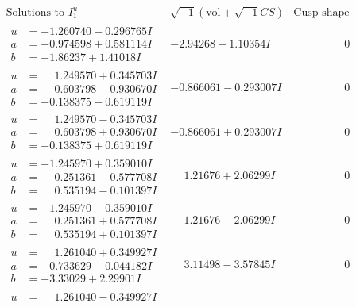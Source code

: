 \documentclass[1p]{elsarticle_modified}
\theoremstyle{definition}
\newcommand{\I}{\sqrt{-1}}
\begin{document}
$$\begin{array}{c|c|c}
\text{Solutions to }I^u_{1}& \I (\text{vol} + \sqrt{-1}CS) & \text{Cusp shape}\\
 \hline 
\begin{aligned}
u &= -1.260740 - 0.296765 I \\
a &= -0.974598 + 0.581114 I \\
b &= -1.86237 + 1.41018 I\end{aligned}
 & -2.94268 - 1.10354 I & \phantom{-0.000000 } 0 \\ \hline\begin{aligned}
u &= \phantom{-}1.249570 + 0.345703 I \\
a &= \phantom{-}0.603798 - 0.930670 I \\
b &= -0.138375 - 0.619119 I\end{aligned}
 & -0.866061 - 0.293007 I & \phantom{-0.000000 } 0 \\ \hline\begin{aligned}
u &= \phantom{-}1.249570 - 0.345703 I \\
a &= \phantom{-}0.603798 + 0.930670 I \\
b &= -0.138375 + 0.619119 I\end{aligned}
 & -0.866061 + 0.293007 I & \phantom{-0.000000 } 0 \\ \hline\begin{aligned}
u &= -1.245970 + 0.359010 I \\
a &= \phantom{-}0.251361 - 0.577708 I \\
b &= \phantom{-}0.535194 - 0.101397 I\end{aligned}
 & \phantom{-}1.21676 + 2.06299 I & \phantom{-0.000000 } 0 \\ \hline\begin{aligned}
u &= -1.245970 - 0.359010 I \\
a &= \phantom{-}0.251361 + 0.577708 I \\
b &= \phantom{-}0.535194 + 0.101397 I\end{aligned}
 & \phantom{-}1.21676 - 2.06299 I & \phantom{-0.000000 } 0 \\ \hline\begin{aligned}
u &= \phantom{-}1.261040 + 0.349927 I \\
a &= -0.733629 - 0.044182 I \\
b &= -3.33029 + 2.29901 I\end{aligned}
 & \phantom{-}3.11498 - 3.57845 I & \phantom{-0.000000 } 0 \\ \hline\begin{aligned}
u &= \phantom{-}1.261040 - 0.349927 I \\

\end{aligned}
\end{array}$$
\end{document}
